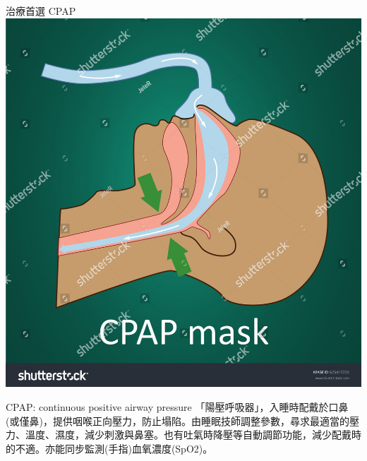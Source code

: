 \documentclass[aspectratio=169]{beamer}
\begin{document}
\begin{frame}{治療首選 CPAP}
    \centering
    \includegraphics[height=0.30\textwidth]{stock-vector-vector-illustration-of-normal-breathing-with-cpap-mask-625415720.jpg}
    
    \begin{block}{CPAP: continuous positive airway pressure}
    「陽壓呼吸器」，入睡時配戴於口鼻(或僅鼻)，提供咽喉正向壓力，防止塌陷。由睡眠技師調整參數，尋求最適當的壓力、溫度、濕度，減少刺激與鼻塞。也有吐氣時降壓等自動調節功能，減少配戴時的不適。亦能同步監測(手指)血氧濃度(SpO2)。
    \end{block}

\end{frame}
\end{document}
